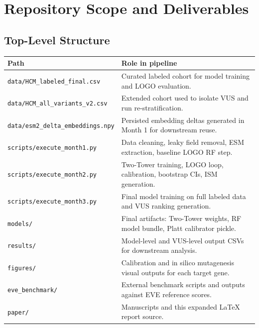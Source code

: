 \documentclass[11pt,a4paper]{article}
\begin{document}
\section{Repository Scope and Deliverables}
\subsection{Top-Level Structure}
\begin{longtable}{p{} p{}}
\toprule
\textbf{Path} & \textbf{Role in pipeline} \\
\midrule
\texttt{data/HCM\_labeled\_final.csv} & Curated labeled cohort for model training and LOGO evaluation. \\
\texttt{data/HCM\_all\_variants\_v2.csv} & Extended cohort used to isolate VUS and run re-stratification. \\
\texttt{data/esm2\_delta\_embeddings.npy} & Persisted embedding deltas generated in Month 1 for downstream reuse. \\
\texttt{scripts/execute\_month1.py} & Data cleaning, leaky field removal, ESM extraction, baseline LOGO RF step. \\
\texttt{scripts/execute\_month2.py} & Two-Tower training, LOGO loop, calibration, bootstrap CIs, ISM generation. \\
\texttt{scripts/execute\_month3.py} & Final model training on full labeled data and VUS ranking generation. \\
\texttt{models/} & Final artifacts: Two-Tower weights, RF model bundle, Platt calibrator pickle. \\
\texttt{results/} & Model-level and VUS-level output CSVs for downstream analysis. \\
\texttt{figures/} & Calibration and in silico mutagenesis visual outputs for each target gene. \\
\texttt{eve\_benchmark/} & External benchmark scripts and outputs against EVE reference scores. \\
\texttt{paper/} & Manuscripts and this expanded LaTeX report source. \\
\bottomrule
\end{longtable}
\end{document}
